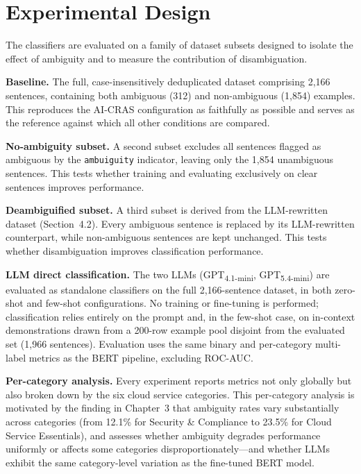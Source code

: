 \section{Experimental Design}
\label{sec:exp-design}

The classifiers are evaluated on a family of dataset subsets designed to isolate the effect of ambiguity and to measure the contribution of disambiguation.

\textbf{Baseline.} The full, case-insensitively deduplicated dataset comprising 2,166 sentences, containing both ambiguous (312) and non-ambiguous (1,854) examples. This reproduces the AI-CRAS configuration as faithfully as possible and serves as the reference against which all other conditions are compared.

\textbf{No-ambiguity subset.} A second subset excludes all sentences flagged as ambiguous by the \texttt{ambuiguity} indicator, leaving only the 1,854 unambiguous sentences. This tests whether training and evaluating exclusively on clear sentences improves performance.

\textbf{Deambiguified subset.} A third subset is derived from the LLM-rewritten dataset (Section~4.2). Every ambiguous sentence is replaced by its LLM-rewritten counterpart, while non-ambiguous sentences are kept unchanged. This tests whether disambiguation improves classification performance.

\textbf{LLM direct classification.} The two LLMs (GPT\textsubscript{4.1-mini}, GPT\textsubscript{5.4-mini}) are evaluated as standalone classifiers on the full 2,166-sentence dataset, in both zero-shot and few-shot configurations. No training or fine-tuning is performed; classification relies entirely on the prompt and, in the few-shot case, on in-context demonstrations drawn from a 200-row example pool disjoint from the evaluated set (1,966 sentences). Evaluation uses the same binary and per-category multi-label metrics as the BERT pipeline, excluding ROC-AUC.

\textbf{Per-category analysis.} Every experiment reports metrics not only globally but also broken down by the six cloud service categories. This per-category analysis is motivated by the finding in Chapter~3 that ambiguity rates vary substantially across categories (from 12.1\% for Security \& Compliance to 23.5\% for Cloud Service Essentials), and assesses whether ambiguity degrades performance uniformly or affects some categories disproportionately—and whether LLMs exhibit the same category-level variation as the fine-tuned BERT model.

